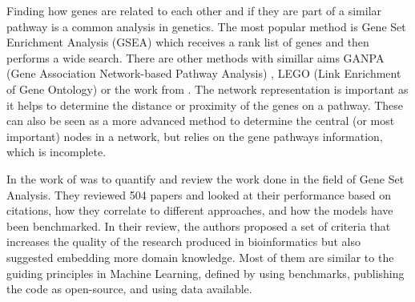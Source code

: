Finding how genes are related to each other and if they are part of a similar pathway is a common analysis in genetics. The most popular method is Gene Set Enrichment Analysis (GSEA) which receives a rank list of genes and then performs a wide search. There are other methods with simillar aims GANPA (Gene Association Network-based Pathway Analysis) \cite{Fang2012-vr}, LEGO (Link Enrichment of Gene Ontology) \cite{Dong2016-zs} or the work from \citet{Cava2018-rv}. The network representation is important as it helps to determine the distance or proximity of the genes on a pathway. These can also be seen as a more advanced method to determine the central (or most important) nodes in a network, but relies on the gene pathways information, which is incomplete.

In the work of \citep{Xie2021-al} was to quantify and review the work done in the field of Gene Set Analysis. They reviewed 504 papers and looked at their performance based on citations, how they correlate to different approaches, and how the models have been benchmarked. In their review, the authors proposed a set of criteria that increases the quality of the research produced in bioinformatics but also suggested embedding more domain knowledge. Most of them are similar to the guiding principles in Machine Learning, defined by using benchmarks, publishing the code as open-source, and using data available.



